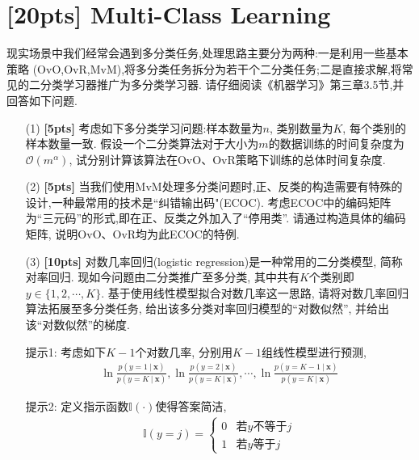 \documentclass[a4paper,UTF8]{article}
\numberwithin{equation}{section}
\theoremstyle{definition}
\def \x {\mathbf{x}}
\newcommand\given[1][]{\:#1\vert\:}
\begin{document}
\section{[20pts] Multi-Class Learning}
现实场景中我们经常会遇到多分类任务,处理思路主要分为两种:一是利用一些基本策略
(OvO,OvR,MvM),将多分类任务拆分为若干个二分类任务;二是直接求解,将常见的二分类学习器推广为多分类学习器. 请仔细阅读《机器学习》第三章3.5节,并回答如下问题.
\begin{enumerate}
	\item[(1)] \textbf{[5pts]}  考虑如下多分类学习问题:样本数量为$n$, 类别数量为$K$, 每个类别的样本数量一致. 假设一个二分类算法对于大小为$m$的数据训练的时间复杂度为$\mathcal{O}(m^\alpha)$, 试分别计算该算法在OvO、OvR策略下训练的总体时间复杂度.
	\item[(2)] \textbf{[5pts]}  当我们使用MvM处理多分类问题时,正、反类的构造需要有特殊的设计,一种最常用的技术是“纠错输出码"(ECOC). 考虑ECOC中的编码矩阵为“三元码”的形式,即在正、反类之外加入了“停用类”. 请通过构造具体的编码矩阵, 说明OvO、OvR均为此ECOC的特例.
	\item[(3)] \textbf{[10pts]}  对数几率回归(logistic regression)是一种常用的二分类模型, 简称对率回归. 现如今问题由二分类推广至多分类, 其中共有$K$个类别即$y \in \{1,2,\cdots, K\}$. 基于使用线性模型拟合对数几率这一思路, 请将对数几率回归算法拓展至多分类任务,
	给出该多分类对率回归模型的“对数似然”, 并给出该“对数似然”的梯度.

	提示1: 考虑如下$K-1$个对数几率, 分别用$K-1$组线性模型进行预测,
	\begin{align*}
		\ln{\frac{p(y=1 \given \x)}{p(y=K \given \x)}}, \ln{\frac{p(y=2 \given \x)}{p(y=K \given \x)}}, \cdots, \ln{\frac{p(y=K-1 \given \x)}{p(y=K \given \x)}}
	\end{align*}

	提示2: 定义指示函数$\mathbb{I}(\cdot)$使得答案简洁,
	\begin{align*}
		\mathbb{I}(y = j) = \begin{cases}
			0 & \text{若$y$不等于$j$} \\
			1 & \text{若$y$等于$j$}
		\end{cases}
	\end{align*}


\end{enumerate}
\end{document}
